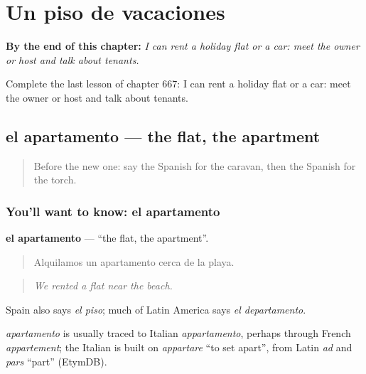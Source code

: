 
\chapter{Un piso de vacaciones}
\label{ch:es-un-piso-de-vacaciones}

\begin{chapteropening}
\textbf{By the end of this chapter:} \emph{I can rent a holiday flat or a car: meet the owner or host and talk about tenants.}

Complete the last lesson of chapter 667: I can rent a holiday flat or a car: meet the owner or host and talk about tenants.
\end{chapteropening}

\section[el apartamento]{el apartamento — the flat, the apartment}

\label{lesson:ES-C667-apartamento}



\begin{quote}
Before the new one: say the Spanish for the caravan, then the Spanish for the torch.
\end{quote}

\subsection*{You'll want to know: el apartamento}
\textbf{el apartamento} — \textquotedblleft{}the flat, the apartment\textquotedblright{}.

\begin{quote}
Alquilamos un apartamento cerca de la playa.
\end{quote}

\begin{quote}
\emph{We rented a flat near the beach.}
\end{quote}

Spain also says \emph{el piso}; much of Latin America says \emph{el departamento}.

\begin{cousinweb}
\emph{apartamento} is usually traced to Italian \emph{appartamento}, perhaps through French \emph{appartement}; the Italian is built on \emph{appartare} \textquotedblleft{}to set apart\textquotedblright{}, from Latin \emph{ad} and \emph{pars} \textquotedblleft{}part\textquotedblright{} (EtymDB).
\end{cousinweb}

